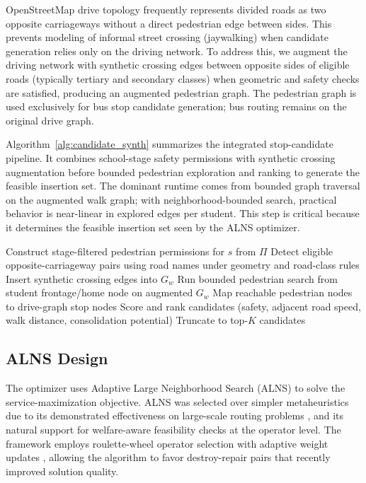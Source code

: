 \documentclass[journal]{IEEEtran}
\begin{document}
OpenStreetMap drive topology frequently represents
divided roads as two opposite carriageways without a direct
pedestrian edge between sides. This prevents modeling of informal
street crossing (jaywalking) when candidate generation relies only
on the driving network. To address this, we augment the driving
network with synthetic crossing edges between opposite sides of
eligible roads (typically tertiary and secondary classes) when
geometric and safety checks are satisfied, producing an augmented
pedestrian graph. The pedestrian graph is used exclusively for bus
stop candidate generation; bus routing remains on the original
drive graph.

Algorithm~\ref{alg:candidate_synth} summarizes the integrated 
stop-candidate pipeline. It combines school-stage safety 
permissions with synthetic crossing augmentation before bounded 
pedestrian exploration and ranking to generate the feasible 
insertion set. The dominant runtime comes from bounded graph 
traversal on the augmented walk graph; with neighborhood-bounded 
search, practical behavior is near-linear in explored edges per 
student. This step is critical because it determines the feasible 
insertion set seen by the ALNS optimizer.

\begin{algorithm}[h]
\caption{Candidate Bus Stop Generation with Synthetic Crossings}
\label{alg:candidate_synth}
Construct stage-filtered pedestrian permissions for $s$ from 
$\Pi$\;
Detect eligible opposite-carriageway pairs using road names under geometry and 
road-class rules\;
Insert synthetic crossing edges into $G_w$\;
Run bounded pedestrian search from student frontage/home node on 
augmented $G_w$\;
Map reachable pedestrian nodes to drive-graph stop nodes\;
Score and rank candidates (safety, adjacent road speed, walk 
distance, consolidation potential)\;
Truncate to top-$K$ candidates\;
\;
\end{algorithm}

\subsection{ALNS Design}

The optimizer uses Adaptive Large Neighborhood Search (ALNS) 
\cite{c9} to solve the service-maximization objective. ALNS was 
selected over simpler metaheuristics due to its demonstrated 
effectiveness on large-scale routing problems \cite{c4}, and its natural support for 
welfare-aware feasibility checks at the operator level. The 
framework employs roulette-wheel operator selection with adaptive 
weight updates \cite{c9}, allowing the algorithm to favor 
destroy-repair pairs that recently improved solution quality.
\end{document}
